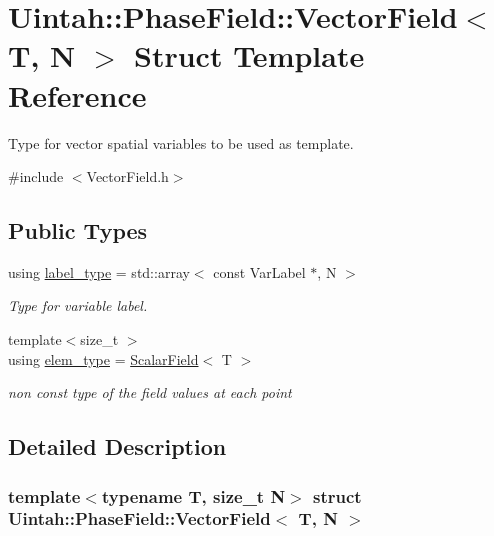 \hypertarget{structUintah_1_1PhaseField_1_1VectorField}{}\section{Uintah\+:\+:Phase\+Field\+:\+:Vector\+Field$<$ T, N $>$ Struct Template Reference}
\label{structUintah_1_1PhaseField_1_1VectorField}


Type for vector spatial variables to be used as template.  




{\ttfamily \#include $<$Vector\+Field.\+h$>$}

\subsection*{Public Types}
\begin{DoxyCompactItemize}
\item 
using \hyperlink{structUintah_1_1PhaseField_1_1VectorField_a59698346336d8cdfdf767367839f2be9}{label\+\_\+type} = std\+::array$<$ const Var\+Label $\ast$, N $>$
\begin{DoxyCompactList}\small\item\em Type for variable label. \end{DoxyCompactList}\item 
{\footnotesize template$<$size\+\_\+t $>$ }\\using \hyperlink{structUintah_1_1PhaseField_1_1VectorField_a4e64ec7a73cce3cb5864b927820e49cf}{elem\+\_\+type} = \hyperlink{structUintah_1_1PhaseField_1_1ScalarField}{Scalar\+Field}$<$ T $>$
\begin{DoxyCompactList}\small\item\em non const type of the field values at each point \end{DoxyCompactList}\end{DoxyCompactItemize}


\subsection{Detailed Description}
\subsubsection*{template$<$typename T, size\+\_\+t N$>$\newline
struct Uintah\+::\+Phase\+Field\+::\+Vector\+Field$<$ T, N $>$}

